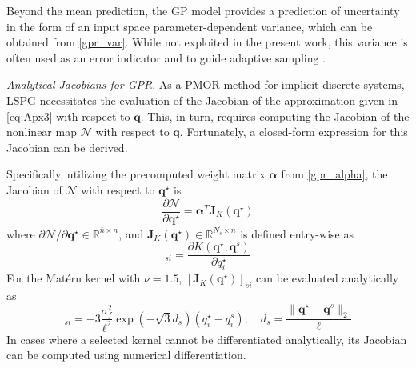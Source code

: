 \documentclass[preprint,10pt]{elsarticle}
\begin{document}
Beyond the mean prediction, the GP model provides a prediction of uncertainty in the form of an input space parameter-dependent variance, which can be obtained from 
\eqref{gpr_var}. While not exploited in the present work, this variance is often used as an error indicator and to guide adaptive sampling \cite{gramacy2020surrogates}.

\emph{Analytical Jacobians for GPR}. As a PMOR method for implicit discrete systems, LSPG \cite{carlberg2011efficient, carlberg2013gnat} necessitates the evaluation of 
the Jacobian of the approximation given in \eqref{eq:Apx3} with respect to $\mathbf{q}$. This, in turn, requires computing the Jacobian of the nonlinear map $\mathcal{N}$ with 
respect to $\mathbf{q}$. Fortunately, a closed-form expression for this Jacobian can be derived.

Specifically, utilizing the precomputed weight matrix $\boldsymbol{\alpha}$ from \eqref{gpr_alpha}, the Jacobian of $\mathcal{N}$ with respect to $\mathbf{q}^\star$ is
\begin{equation}
	  \frac{\partial \mathcal{N}}{\partial \mathbf{q}^\star} = \boldsymbol{\alpha}^T \mathbf{J}_K(\mathbf{q}^\star)
	    \label{eq:jacobian_N}
\end{equation}
where ${\partial \mathcal{N}}/{\partial \mathbf{q}^\star} \in \mathbb{R}^{\bar{n} \times n}$, and $\mathbf{J}_K(\mathbf{q}^\star) \in \mathbb{R}^{N_s^\prime \times n}$ is 
defined entry-wise as
\begin{equation}
	[\mathbf{J}_K(\mathbf{q}^\star)]_{si} = \frac{\partial K(\mathbf{q}^\star, \mathbf{q}^s)}{\partial q_i^\star}
	\label{eq:jacobian_k_entry}
\end{equation}
For the Matérn kernel with $\nu=1.5$, $[\mathbf{J}_K(\mathbf{q}^\star)]_{si}$ can be evaluated analytically as
\begin{equation*}
	[\mathbf{J}_K(\mathbf{q}^\star)]_{si} = -3\frac{\sigma_f^2}{\ell^2}\exp\left(-\sqrt{3}d_s\right)\left(q_i^\star - q_i^s\right),
	\quad d_s=\frac{\|\mathbf{q}^\star - \mathbf{q}^s\|_2}{\ell}
	\label{eq:matern_jacobian}
\end{equation*}
In cases where a selected kernel cannot be differentiated analytically, its Jacobian can be computed using numerical differentiation.
\end{document}
